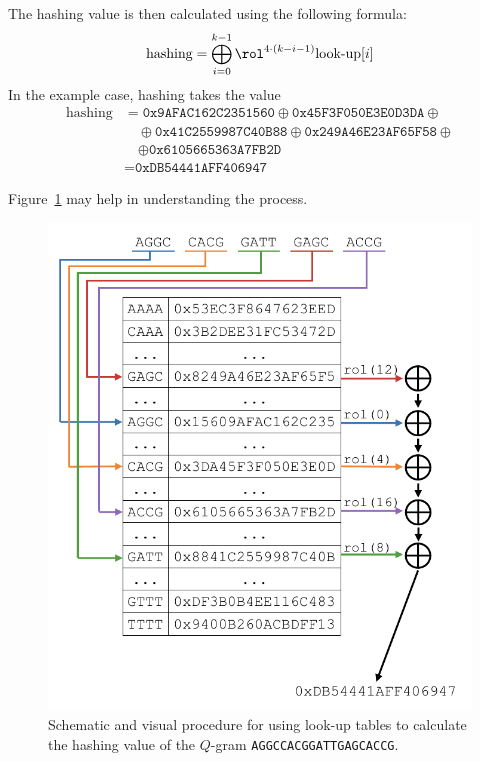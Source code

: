 \begin{example}
	The hashing value is then calculated using the following formula: \[ \text{hashing} = \bigoplus_{i = 0}^{k - 1} \rol^{4 \cdot (k - i - 1)} \text{look-up}[i] \] 
	In the example case, hashing takes the value \begin{align*}
		\text{hashing} &= \texttt{0x9AFAC162C2351560} \oplus \texttt{0x45F3F050E3E0D3DA} \oplus {} \\
		&\quad {} \oplus \texttt{0x41C2559987C40B88} \oplus \texttt{0x249A46E23AF65F58} \oplus {} \\
		&\quad {} \oplus \texttt{0x6105665363A7FB2D} \\
		&= \texttt{0xDB54441AFF406947} 
	\end{align*}
	
	Figure~\ref{fig:lookup-table} may help in understanding the process.
\end{example}

\begin{figure}[!ht]
	\centering
	\includegraphics[width=0.85\linewidth]{images/lookup-table}
	\caption[Schematic procedure for using look-up tables.]{Schematic and visual procedure for using look-up tables to calculate the hashing value of the $Q$-gram \texttt{AGGCCACGGATTGAGCACCG}.}
	\label{fig:lookup-table}
\end{figure}

